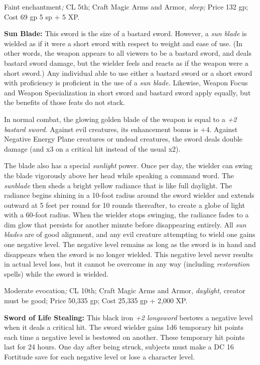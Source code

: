 Faint enchantment\textit{; }CL 5th; Craft Magic Arms and Armor, \textit{sleep; 
}Price 132 gp; Cost 69 gp 5 sp + 5 XP.

\textbf{Sun Blade:} This sword is the size of a bastard sword. However, a \textit{sun 
blade }is wielded as if it were a short sword with respect to weight and ease of 
use. (In other words, the weapon appears to all viewers to be a bastard sword, 
and deals bastard sword damage, but the wielder feels and reacts as if the weapon 
were a short sword.) Any individual able to use either a bastard sword or a short 
sword with proficiency is proficient in the use of a \textit{sun blade. }Likewise, 
Weapon Focus and Weapon Specialization in short sword and bastard sword apply equally, 
but the benefits of those feats do not stack.

In normal combat, the glowing golden blade of the weapon is equal to a \textit{+2 
bastard sword. }Against evil creatures, its enhancement bonus is +4. Against Negative 
Energy Plane creatures or undead creatures, the sword deals double damage (and 
x3 on a critical hit instead of the usual x2).

The blade also has a special \textit{sunlight }power. Once per day, the wielder 
can swing the blade vigorously above her head while speaking a command word. The 
\textit{sunblade }then sheds a bright yellow radiance that is like full daylight. 
The radiance begins shining in a 10-foot radius around the sword wielder and extends 
outward at 5 feet per round for 10 rounds thereafter, to create a globe of light 
with a 60-foot radius. When the wielder stops swinging, the radiance fades to a 
dim glow that persists for another minute before disappearing entirely. All \textit{sun 
blades }are of good alignment, and any evil creature attempting to wield one gains 
one negative level. The negative level remains as long as the sword is in hand 
and disappears when the sword is no longer wielded. This negative level never results 
in actual level loss, but it cannot be overcome in any way (including \textit{restoration 
}spells) while the sword is wielded.

Moderate evocation\textit{; }CL 10th; Craft Magic Arms and Armor, \textit{daylight, 
}creator must be good; Price 50,335 gp; Cost 25,335 gp + 2,000 XP.

\textbf{Sword of Life Stealing: }This black iron \textit{+2 longsword }bestows 
a negative level when it deals a critical hit. The sword wielder gains 1d6 temporary 
hit points each time a negative level is bestowed on another. These temporary hit 
points last for 24 hours. One day after being struck, subjects must make a DC 16 
Fortitude save for each negative level or lose a character level.

